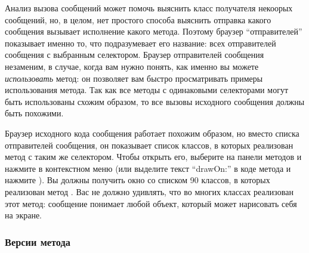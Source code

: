 \documentclass[a4paper,10pt,twoside]{book}
\begin{document}
Анализ вызова сообщений может помочь выяснить класс получателя некоорых сообщений, но, в целом, нет простого способа выяснить отправка какого сообщения вызывает исполнение какого метода. Поэтому браузер ``отправителей'' показывает именно то, что подразумевает его название: всех отправителей сообщения с выбранным селектором. Браузер отправителей сообщения незаменим, в случае, когда вам нужно понять, как именно вы можете \emph{использовать} метод: он позволяет вам быстро просматривать примеры использования метода.  Так как все методы с одинаковыми селекторами могут быть использованы схожим образом, то все вызовы исходного сообщения должны быть похожими.


Браузер исходного кода сообщения работает похожим образом, но вместо списка отправителей сообщения, он показывает список классов, в которых реализован метод с таким же селектором. Чтобы открыть его, выберите  на панели методов и нажмите  в контекстном меню (или выделите текст ``drawOn:'' в коде метода и нажмите ). Вы должны получить окно со списком 90 классов, в которых реализован метод . Вас не должно удивлять, что во многих классах реализован этот метод: сообщение  понимает любой объект, который может нарисовать себя на экране.

\subsubsection{Версии метода}

\end{document}
